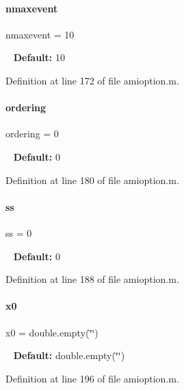 \paragraph{\texorpdfstring{nmaxevent}{nmaxevent}}
{\footnotesize\ttfamily nmaxevent = 10}

~\newline
{\bfseries Default\+:} 10 

Definition at line 172 of file amioption.\+m.

\mbox{\label{classamioption_aa5d555210685086c19e5d08afca6685b}} 
\paragraph{\texorpdfstring{ordering}{ordering}}
{\footnotesize\ttfamily ordering = 0}

~\newline
{\bfseries Default\+:} 0 

Definition at line 180 of file amioption.\+m.

\mbox{\label{classamioption_a8f60c8102d29fcd525162d02eed4566b}} 
\paragraph{\texorpdfstring{ss}{ss}}
{\footnotesize\ttfamily ss = 0}

~\newline
{\bfseries Default\+:} 0 

Definition at line 188 of file amioption.\+m.

\mbox{\label{classamioption_aa48da42c617fdb7cf84e9a3f80aa04e8}} 
\paragraph{\texorpdfstring{x0}{x0}}
{\footnotesize\ttfamily x0 = double.\+empty(\char`\"{}\char`\"{})}

~\newline
{\bfseries Default\+:} double.\+empty(\char`\"{}\char`\"{}) 

Definition at line 196 of file amioption.\+m.

